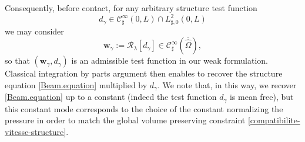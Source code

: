 \documentclass[JEP,XML,SOM,Unicode,NoFloatCountersInSection]{cedram}
\let\mathcal\mathscr
\theoremstyle{remark}
\theoremstyle{definition}
\newcommand{\wg}{\boldsymbol{w}}
\begin{document}
Consequently, before contact, for any arbitrary structure test function
\[
d_{\gamma} \in \mathcal{C}^{\infty}_{\sharp}(0,L) \cap L^2_{\sharp,0}(0,L)
\]
we may consider
\[
\wg_{\gamma} := \mathcal R_{{\lambda}}[d_{\gamma}] \in \mathcal{C}^{\infty}_{\sharp}(\overline{\hat{\Omega}}),
\]
so that $(\wg_{\gamma},d_{\gamma})$ is an admissible test function in our weak formulation. Classical integration by parts argument then enables to recover the structure equation \eqref{Beam.equation} multiplied by $d_{\gamma}$. We note that, in this way, we recover \eqref{Beam.equation} up to a constant (indeed the test function $d_{\gamma}$ is mean free), but this constant mode corresponds to the choice of the constant normalizing the pressure in order to match the global volume preserving constraint
\eqref{compatibilite-vitesse-structure}.
\end{document}
